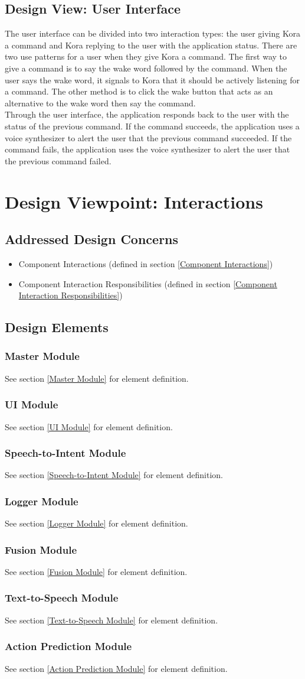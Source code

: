 \documentclass[onecolumn, draftclsnofoot,10pt, compsoc]{IEEEtran}
\def \botname{Kora\xspace}
\newcommand{\designConcernRef}[1]{
    #1 (defined in section \ref{#1})
}
\newcommand{\designElementRef}[1]{
    \subsubsection{#1}
        See section \ref{#1} for element definition.
}
\begin{document}
    \subsection{Design View: User Interface}
        The user interface can be divided into two interaction types: the user giving \botname a command and \botname replying to the user with the application status. 
        There are two use patterns for a user when they give \botname a command. The first way to give a command is to say the wake word followed by the command.
        When the user says the wake word, it signals to \botname that it should be actively listening for a command.
        The other method is to click the wake button that acts as an alternative to the wake word then say the command.  
        \\[0.1in]

        Through the user interface, the application responds back to the user with the status of the previous command.
        If the command succeeds, the application uses a voice synthesizer to alert the user that the previous command succeeded.
        If the command fails, the application uses the voice synthesizer to alert the user that the previous command failed.

\section{Design Viewpoint: Interactions}
    \subsection{Addressed Design Concerns}
        \begin{itemize}
            \item \designConcernRef{Component Interactions}
            \item \designConcernRef{Component Interaction Responsibilities}
        \end{itemize}

    \subsection{Design Elements}
        \designElementRef{Master Module}
        \designElementRef{UI Module}
        \designElementRef{Speech-to-Intent Module}
        \designElementRef{Logger Module}
        \designElementRef{Fusion Module}
        \designElementRef{Text-to-Speech Module}
        \designElementRef{Action Prediction Module}
\end{document}
